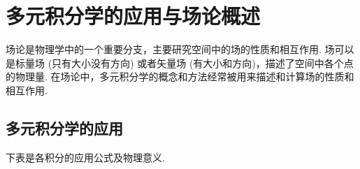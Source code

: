 \section{多元积分学的应用与场论概述}

场论是物理学中的一个重要分支，主要研究空间中的场的性质和相互作用. 
场可以是标量场 (只有大小没有方向) 或者矢量场 (有大小和方向)，描述了空间中各个点的物理量. 
在场论中，多元积分学的概念和方法经常被用来描述和计算场的性质和相互作用. 

\subsection{多元积分学的应用}

下表是各积分的应用公式及物理意义.
\setcounter{magicrownumbers}{0}
\begin{table}[H]
    \centering
\end{table}
